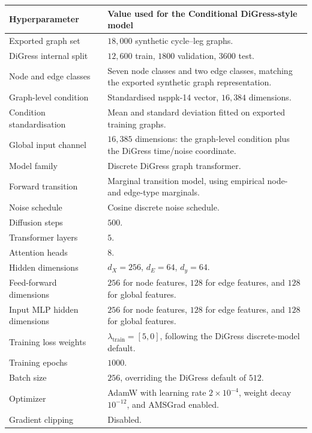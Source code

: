 \begin{table}[p]
\centering
\footnotesize
\begin{tabularx}{\textwidth}{@{}p{}X@{}}
\toprule
Hyperparameter & Value used for the Conditional DiGress-style model \\
\midrule
Exported graph set & \(18{,}000\) synthetic cycle--leg graphs. \\
DiGress internal split & \(12{,}600\) train, \(1800\) validation, \(3600\) test. \\
Node and edge classes & Seven node classes and two edge classes, matching the exported synthetic graph representation. \\
Graph-level condition & Standardised \gls{nsppk}-14 vector, \(16{,}384\) dimensions. \\
Condition standardisation & Mean and standard deviation fitted on exported training graphs. \\
Global input channel & \(16{,}385\) dimensions: the graph-level condition plus the DiGress time/noise coordinate. \\
Model family & Discrete DiGress graph transformer. \\
Forward transition & Marginal transition model, using empirical node- and edge-type marginals. \\
Noise schedule & Cosine discrete noise schedule. \\
Diffusion steps & \(500\). \\
Transformer layers & \(5\). \\
Attention heads & \(8\). \\
Hidden dimensions & \(d_X=256\), \(d_E=64\), \(d_y=64\). \\
Feed-forward dimensions & \(256\) for node features, \(128\) for edge features, and \(128\) for global features. \\
Input MLP hidden dimensions & \(256\) for node features, \(128\) for edge features, and \(128\) for global features. \\
Training loss weights & \(\lambda_{\mathrm{train}}=[5,0]\), following the DiGress discrete-model default. \\
Training epochs & \(1000\). \\
Batch size & \(256\), overriding the DiGress default of \(512\). \\
Optimizer & AdamW with learning rate \(2\times 10^{-4}\), weight decay \(10^{-12}\), and AMSGrad enabled. \\
Gradient clipping & Disabled. \\

\end{tabularx}
\end{table}
